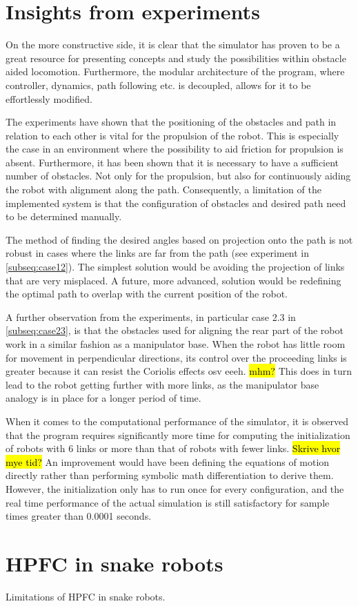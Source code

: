 \section{Insights from experiments}

On the more constructive side, it is clear that the simulator has proven to be a great resource for presenting concepts and study the possibilities within obstacle aided locomotion. Furthermore, the modular architecture of the program, where controller, dynamics, path following etc. is decoupled, allows for it to be effortlessly modified.

The experiments have shown that the positioning of the obstacles and path in relation to each other is vital for the propulsion of the robot. This is especially the case in an environment where the possibility to aid friction for propulsion is absent. Furthermore, it has been shown that it is necessary to have a sufficient number of obstacles. Not only for the propulsion, but also for continuously aiding the robot with alignment along the path. Consequently, a limitation of the implemented system is that the configuration of obstacles and desired path need to be determined manually.

The method of finding the desired angles based on projection onto the path is not robust in cases where the links are far from the path (see experiment in \ref{subseq:case12}). The simplest solution would be avoiding the projection of links that are very misplaced. A future, more advanced, solution would be redefining the optimal path to overlap with the current position of the robot.

A further observation from the experiments, in particular case 2.3 in \ref{subseq:case23}, is that the obstacles used for aligning the rear part of the robot work in a similar fashion as a manipulator base. When the robot has little room for movement in perpendicular directions, its control over the proceeding links is greater because it can resist the Coriolis effects osv eeeh. \hl{mhm?} This does in turn lead to the robot getting further with more links, as the manipulator base analogy is in place for a longer period of time.

When it comes to the computational performance of the simulator, it is observed that the program requires significantly more time for computing the initialization of robots with 6 links or more than that of robots with fewer links. \hl{Skrive hvor mye tid?} An improvement would have been defining the equations of motion directly rather than performing symbolic math differentiation to derive them. However, the initialization only has to run once for every configuration, and the real time performance of the actual simulation is still satisfactory for sample times greater than 0.0001 seconds.

\section{HPFC in snake robots}

Limitations of HPFC in snake robots.



